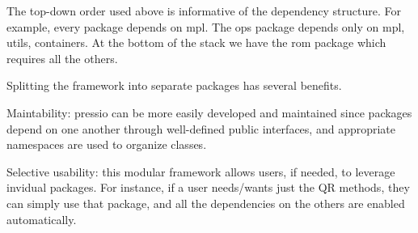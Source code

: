 The top-\/down order used above is informative of the dependency structure. For example, every package depends on {\ttfamily mpl}. The {\ttfamily ops} package depends only on {\ttfamily mpl}, {\ttfamily utils}, {\ttfamily containers}. At the bottom of the stack we have the {\ttfamily rom} package which requires all the others.

Splitting the framework into separate packages has several benefits.
\begin{DoxyItemize}
\item Maintability\+: {\ttfamily pressio} can be more easily developed and maintained since packages depend on one another through well-\/defined public interfaces, and appropriate namespaces are used to organize classes.
\item Selective usability\+: this modular framework allows users, if needed, to leverage invidual packages. For instance, if a user needs/wants just the QR methods, they can simply use that package, and all the dependencies on the others are enabled automatically. 
\end{DoxyItemize}